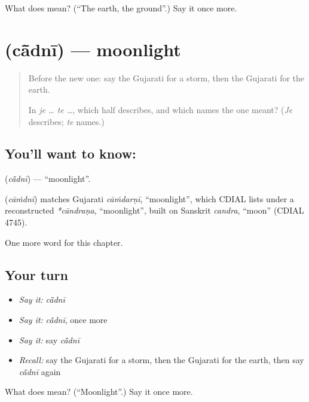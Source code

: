 \begin{tcolorbox}[breakable,colback=teal!4,colframe=teal!35!black,title={Before you move on}]
What does  mean? (\textquotedblleft{}The earth, the ground\textquotedblright{}.) Say it once more.
\end{tcolorbox}
\section[\texorpdfstring{\gu{ચાંદની} (cā̃dnī)}{ચાંદની (cā̃dnī)}]{ (cā̃dnī) — moonlight}

\label{lesson:GU-C120-cadni}



\begin{quote}
Before the new one: say the Gujarati for a storm, then the Gujarati for the earth.

In \emph{je … te …}, which half describes, and which names the one meant? (\emph{Je} describes; \emph{te} names.)
\end{quote}

\subsection*{You'll want to know: }
\textbf{} (\emph{cā̃dnī}) — \textquotedblleft{}moonlight\textquotedblright{}.

\begin{cousinweb}
\textbf{} (\emph{cāṁdnī}) matches Gujarati \emph{cāṁdarṇī}, \textquotedblleft{}moonlight\textquotedblright{}, which CDIAL lists under a reconstructed \emph{*cāndraṇa}, \textquotedblleft{}moonlight\textquotedblright{}, built on Sanskrit \emph{candra}, \textquotedblleft{}moon\textquotedblright{} (CDIAL 4745).
\end{cousinweb}

\begin{grammarlens}[title={What you've built}]
One more word for this chapter.
\end{grammarlens}

\subsection*{Your turn}
\begin{itemize}
\raggedright
  \item \emph{Say it:} \emph{cā̃dnī}
  \item \emph{Say it:} \emph{cā̃dnī}, once more
  \item \emph{Say it:} say \emph{cā̃dnī}
  \item \emph{Recall:} say the Gujarati for a storm, then the Gujarati for the earth, then say \emph{cā̃dnī} again
\end{itemize}

\begin{tcolorbox}[breakable,colback=teal!4,colframe=teal!35!black,title={Before you move on}]
What does  mean? (\textquotedblleft{}Moonlight\textquotedblright{}.) Say it once more.
\end{tcolorbox}
